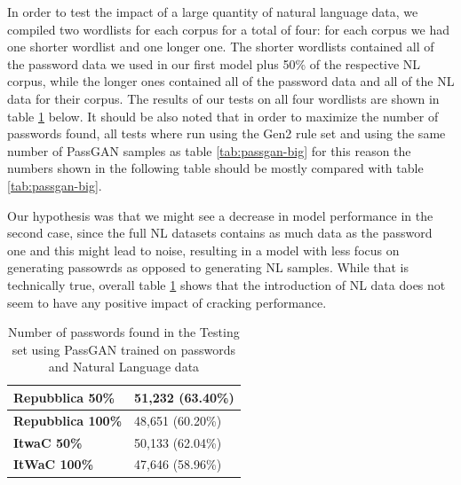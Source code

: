 In order to test the impact of a large quantity of natural language data, we compiled two wordlists for each corpus for a total of four: for each corpus we had one shorter wordlist and one longer one.
The shorter wordlists contained all of the password data we used in our first model plus 50\% of the respective NL corpus, while the longer ones contained all of the password data and all of the NL data for their corpus.
The results of our tests on all four wordlists are shown in table \ref{tab:nl-results} below. It should be also noted that in order to maximize the number of passwords found, all tests where run using the Gen2 rule set and using the same number of PassGAN samples as table \ref{tab:passgan-big} for this reason the numbers shown in the following table should be mostly compared with table \ref{tab:passgan-big}.

Our hypothesis was that we might see a decrease in model performance in the second case, since the full NL datasets contains as much data as the password one and this might lead to noise, resulting in a model with less focus on generating passowrds as opposed to generating NL samples. While that is technically true, overall table \ref{tab:nl-results} shows that the introduction of NL data does not seem to have any positive impact of cracking performance.

\begin{table}[H]
\centering
\begin{tabular}{|l|l|}
\hline
\textbf{Repubblica 50\%} & 51,232 (63.40\%) \\ \hline
\textbf{Repubblica 100\%} & 48,651 (60.20\%)  \\ \hline
\textbf{ItwaC 50\%} & 50,133 (62.04\%)  \\ \hline
\textbf{ItWaC 100\%} & 47,646 (58.96\%)  \\ \hline
\end{tabular}
\caption{Number of passwords found in the Testing set using PassGAN trained on passwords and Natural Language data}
\label{tab:nl-results}
\end{table}

